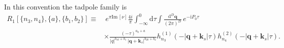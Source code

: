 \documentclass[a4paper,12pt]{article}
\newcommand{\FR}[2]{\displaystyle\frac{\,{#1}\,}{#2}}
\def\di{{\mathrm{d}}}
\def\mb{\mathbf}
\def\ii{\mathrm{i}}
\def\Im{\mathrm{Im}\,}
\begin{document}
In this convention the tadpole family is
\begin{align}
	R_1[\{n_3,n_4\},\{a\},\{b_1,b_2\}] \equiv &~e^{\pi \Im [\nu]}\frac{4i}{\pi}\int_{-\infty}^0 \di\tau \int \FR{\di^D \mb q}{(2\pi)^D}\, e^{-\ii P_0\tau}\nonumber\\
	&\times
	\frac{(-\tau)^{a_0+a}}{|q|^{b_{10}+b_1}\,|\bm q+\bm k_s|^{b_{20}+b_2}}
	h_{n_3}^{(1)}(-|\bm q+\bm k_s|\tau)h_{n_4}^{(2)}(-|\bm q+\bm k_s|\tau).
\end{align}


\end{document}
